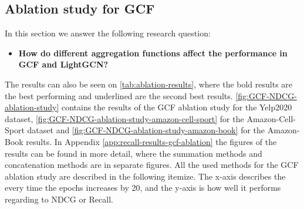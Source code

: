 \subsection{Ablation study for GCF}\label{subsec:gcf-ablation-study}
In this section we answer the following research question:
\begin{itemize}
    \item \textbf{How do different aggregation functions affect the performance in GCF and LightGCN?}
\end{itemize}
The results can also be seen on \autoref{tab:ablation-results}, where the bold results are the best performing and underlined are the second best results.
\autoref{fig:GCF-NDCG-ablation-study} contains the results of the GCF ablation study for the Yelp2020 dataset, \autoref{fig:GCF-NDCG-ablation-study-amazon-cell-sport} for the Amazon-Cell-Sport dataset and \autoref{fig:GCF-NDCG-ablation-study-amazon-book} for the Amazon-Book results.
In Appendix \ref{app:recall-results-gcf-ablation} the figures of the results can be found in more detail, where the summation methods and concatenation methods are in separate figures.
All the used methods for the GCF ablation study are described in the following itemize.
The x-axis describes the every time the epochs increases by 20, and the y-axis is how well it performs regarding to NDCG or Recall.
